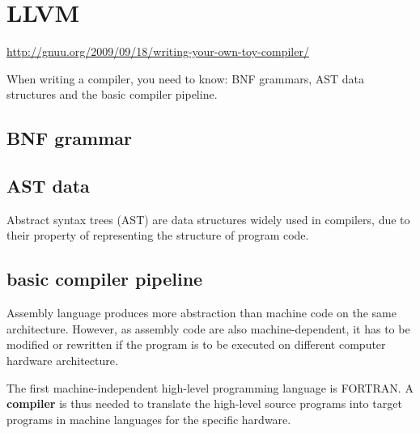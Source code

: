 \chapter{LLVM}
\label{chap:LLVM}

\url{http://gnuu.org/2009/09/18/writing-your-own-toy-compiler/}

When writing a compiler, you need to know:
BNF grammars, AST data structures and the basic compiler pipeline.

\section{BNF grammar}
\label{sec:BNF_grammar}

\section{AST data}
\label{sec:AST-data-structure}

Abstract syntax trees (AST) are data structures widely used in compilers, due to
their property of representing the structure of program code. 

\section{basic compiler pipeline}


Assembly language produces more abstraction than machine code on the same
architecture. However, as assembly code are also machine-dependent, 
it has to be modified or rewritten if the program is to be executed on different
computer hardware architecture.

The first machine-independent high-level programming language is FORTRAN.
A {\bf compiler} is thus needed to translate the high-level source programs
into target programs in machine languages for the specific hardware. 

